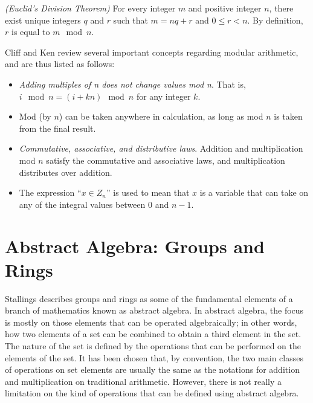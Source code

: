 \begin{theorem}
\emph{(Euclid's Division Theorem)} For every integer $m$ and positive integer $n$, there exist unique integers $q$ and $r$ such that $m=nq+r$ and $0 \leq r < n$. By definition, $r$ is equal to $m \mod n$.
\end{theorem}

Cliff and Ken \cite{cs21math19notes} review several important concepts regarding modular arithmetic, and are thus listed as follows:

\begin{itemize}
\item \textit{Adding multiples of n does not change values mod n}. That is, \\ $i \mod n= (i+kn) \mod n$ for any integer $k$.

\item Mod (by $n$) can be taken anywhere in calculation, as long as mod $n$ is taken from the final result.

\item \textit{Commutative, associative, and distributive laws}. Addition and multiplication mod $n$ satisfy the commutative and associative laws, and multiplication distributes over addition.

\item The expression ``$x \in Z_{n}$'' is used to mean that $x$ is a variable that can take on any of the integral values between 0 and $n-1$.
\end{itemize}

\section{Abstract Algebra: Groups and Rings}

Stallings \cite{CryptoStallings} describes groups and rings as some of the fundamental elements of a branch of mathematics known as abstract algebra. In abstract algebra, the focus is mostly on those elements that can be operated algebraically; in other words, how two elements of a set can be combined to obtain a third element in the set. The nature of the set is defined by the operations that can be performed on the elements of the set. It has been chosen that, by convention, the two main classes of operations on set elements are usually the same as the notations for addition and multiplication on traditional arithmetic. However, there is not really a limitation on the kind of operations that can be defined using abstract algebra.

